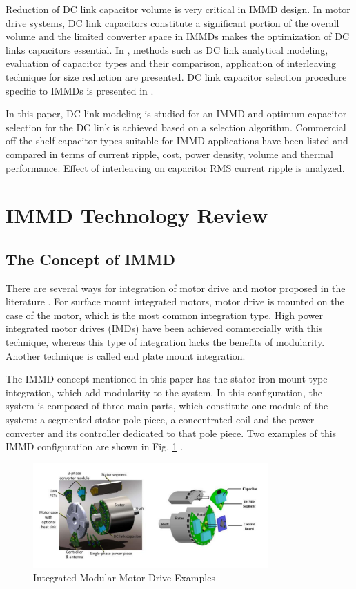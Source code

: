 \documentclass[conference,a4paper,twocolumn]{IEEEtran}
\begin{document}
Reduction of DC link capacitor volume is very critical in IMMD design. In motor drive systems, DC link capacitors constitute a significant portion of the overall volume and the limited converter space in IMMDs makes the optimization of DC links capacitors essential. In \cite{Su2010,Bianchi2003,Zhang2010}, methods such as DC link analytical modeling, evaluation of capacitor types and their comparison, application of interleaving technique for size reduction are presented. DC link capacitor selection procedure specific to IMMDs is presented in \cite{LoCalzo2016,Wang2014,Wang2015b}.

In this paper, DC link modeling is studied for an IMMD and optimum capacitor selection for the DC link is achieved based on a selection algorithm. Commercial off-the-shelf capacitor types suitable for IMMD applications have been listed and compared in terms of current ripple, cost, power density, volume and thermal performance. Effect of interleaving on capacitor RMS current ripple is analyzed.



\section{IMMD Technology Review}

\subsection{The Concept of IMMD}

There are several ways for integration of motor drive and motor proposed in the literature \cite{LoCalzo2016,Wolmarans2008}. For surface mount integrated motors, motor drive is mounted on the case of the motor, which is the most common integration type. High power integrated motor drives (IMDs) have been achieved commercially with this technique, whereas this type of integration lacks the benefits of modularity. Another technique is called end plate mount integration.

The IMMD concept mentioned in this paper has the stator iron mount type integration, which add modularity to the system. In this configuration, the system is composed of three main parts, which constitute one module of the system: a segmented stator pole piece, a concentrated coil and the power converter and its controller dedicated to that pole piece. Two examples of this IMMD configuration are shown in Fig. \ref{fig1} \cite{LoCalzo2016,Wang2015b}.


\begin{figure}[h]
  \centering
  \includegraphics[width=9cm]{fig1}
  \caption{Integrated Modular Motor Drive Examples \cite{LoCalzo2016,Wang2015b}}
  \label{fig1}
\end{figure}
\end{document}
